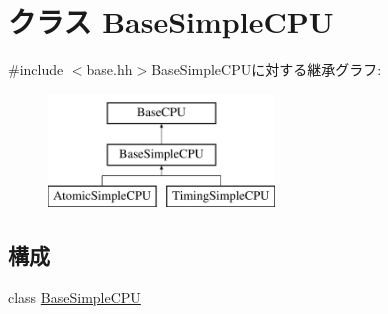 \hypertarget{classBaseSimpleCPU}{
\section{クラス BaseSimpleCPU}
\label{classBaseSimpleCPU}
}


{\ttfamily \#include $<$base.hh$>$}BaseSimpleCPUに対する継承グラフ:\begin{figure}[H]
\begin{center}
\leavevmode
\includegraphics[height=3cm]{classBaseSimpleCPU}
\end{center}
\end{figure}
\subsection*{構成}
\begin{DoxyCompactItemize}
\item 
class \hyperlink{classBaseSimpleCPU_1_1BaseSimpleCPU}{BaseSimpleCPU}
\end{DoxyCompactItemize}
